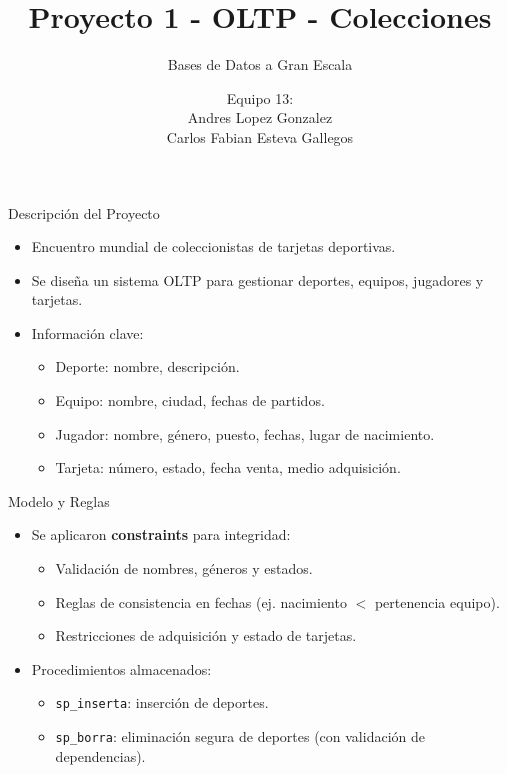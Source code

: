 \documentclass{beamer}
\title{Proyecto 1 - OLTP - Colecciones}
\subtitle{Bases de Datos a Gran Escala}
\author{Equipo 13: \\ Andres Lopez Gonzalez \\ Carlos Fabian Esteva Gallegos}
\date{}
\begin{document}
\begin{frame}
  \titlepage
\end{frame}

\begin{frame}{Descripción del Proyecto}
  \begin{itemize}
    \item Encuentro mundial de coleccionistas de tarjetas deportivas.
    \item Se diseña un sistema OLTP para gestionar deportes, equipos, jugadores y tarjetas.
    \item Información clave:
    \begin{itemize}
      \item Deporte: nombre, descripción.
      \item Equipo: nombre, ciudad, fechas de partidos.
      \item Jugador: nombre, género, puesto, fechas, lugar de nacimiento.
      \item Tarjeta: número, estado, fecha venta, medio adquisición.
    \end{itemize}
  \end{itemize}
\end{frame}

\begin{frame}{Modelo y Reglas}
  \begin{itemize}
    \item Se aplicaron \textbf{constraints} para integridad:
    \begin{itemize}
      \item Validación de nombres, géneros y estados.
      \item Reglas de consistencia en fechas (ej. nacimiento $<$ pertenencia equipo).
      \item Restricciones de adquisición y estado de tarjetas.
    \end{itemize}
    \item Procedimientos almacenados:
    \begin{itemize}
      \item \texttt{sp\_inserta}: inserción de deportes.
      \item \texttt{sp\_borra}: eliminación segura de deportes (con validación de dependencias).
    \end{itemize}
  \end{itemize}
\end{frame}
\end{document}
